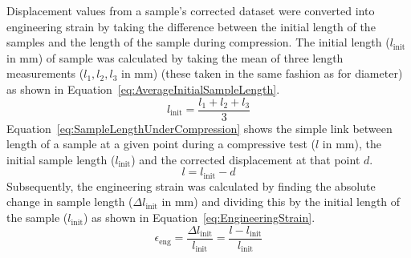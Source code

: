 Displacement values from a sample's corrected dataset were converted into
 engineering strain by taking the difference between the initial length of 
 the samples and the length of the sample during compression.
The initial length (\(l_{\mathrm{init}}\) in \unit{\milli\metre}) of sample 
 was calculated by taking the mean of three length measurements 
 (\(l_{1},l_{2},l_{3}\) in \unit{\milli\metre}) (these taken in the same 
 fashion as for diameter) as shown in Equation~\ref{eq:AverageInitialSampleLength}.
\begin{equation}\label{eq:AverageInitialSampleLength}
    l_{\mathrm{init}} = \frac{l_{1}+l_{2}+l_{3}}{3}
\end{equation}
Equation~\ref{eq:SampleLengthUnderCompression} shows the simple link between
 length of a sample at a given point during a compressive test (\(l\) in
 \unit{\milli\metre}), the initial sample length (\(l_{\mathrm{init}}\)) and the
 corrected displacement at that point \(d\).
\begin{equation}\label{eq:SampleLengthUnderCompression}
    l = l_{\mathrm{init}}-d
\end{equation}
Subsequently, the engineering strain was calculated by finding the 
 absolute change in sample length (\(\Delta l_{\mathrm{init}}\) in 
 \unit{\milli\metre}) and dividing this by the initial length of the
 sample (\(l_{\mathrm{init}}\)) as shown in 
 Equation~\ref{eq:EngineeringStrain}.
\begin{equation}\label{eq:EngineeringStrain}
    \epsilon _{\mathrm{eng}}=\frac{\Delta l_{\mathrm{init}}}{l_{\mathrm{init}}}=\frac{l-l_{\mathrm{init}}}{l_{\mathrm{init}}}
\end{equation}


